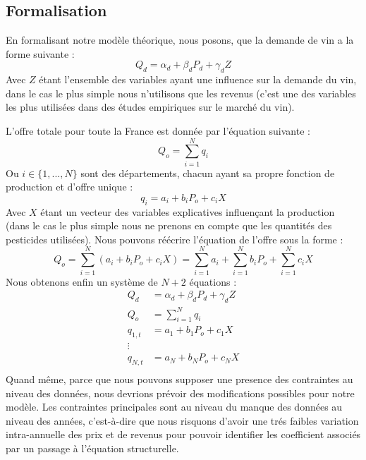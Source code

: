 \documentclass[11pt,]{article}
\begin{document}
\hypertarget{formalisation}{%
\subsection{Formalisation}\label{formalisation}}

En formalisant notre modèle théorique, nous posons, que la demande de
vin a la forme suivante : \begin{equation}
    Q_d = \alpha_d + \beta_d P_d + \gamma_d Z 
\end{equation} Avec \(Z\) étant l'ensemble des variables ayant une
influence sur la demande du vin, dans le cas le plus simple nous
n'utilisons que les revenus (c'est une des variables les plus utilisées
dans des études empiriques sur le marché du vin).

\par

L'offre totale pour toute la France est donnée par l'équation suivante :
\begin{equation}
    Q_o = \sum_{i = 1}^{N} q_i
\end{equation} Ou \(i \in \{1, ..., N\}\) sont des départements, chacun
ayant sa propre fonction de production et d'offre unique :
\begin{equation}
    q_i = a_i + b_i P_o + c_i X
\end{equation} Avec \(X\) étant un vecteur des variables explicatives
influençant la production (dans le cas le plus simple nous ne prenons en
compte que les quantités des pesticides utilisées). Nous pouvons
réécrire l'équation de l'offre sous la forme : \begin{equation}
    Q_o = \sum_{i = 1}^{N} (a_i + b_i P_o + c_i X) = \sum_{i = 1}^{N} a_i + \sum_{i = 1}^{N} b_i P_o + \sum_{i = 1}^{N} c_i X
\end{equation} Nous obtenons enfin un système de \(N + 2\) équations :
\begin{align*}
    Q_d & = \alpha_d + \beta_d P_d + \gamma_d Z \\
    Q_o & = \sum_{i = 1}^{N} q_i \\
    q_{1,t} & = a_1 + b_1 P_o + c_1 X \\ 
    \vdots \\ 
    q_{N,t} & = a_N + b_N P_o + c_N X \\
\end{align*} Quand même, parce que nous pouvons supposer une presence
des contraintes au niveau des données, nous devrions prévoir des
modifications possibles pour notre modèle. Les contraintes principales
sont au niveau du manque des données au niveau des années, c'est-à-dire
que nous risquons d'avoir une trés faibles variation intra-annuelle des
prix et de revenus pour pouvoir identifier les coefficient associés par
un passage à l'équation structurelle.
\end{document}
